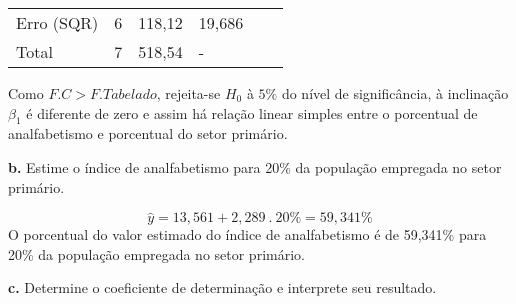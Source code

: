 \documentclass[
  openany]{book}
\begin{document}
\begin{longtable}[]{@{}llllll@{}}
\begin{minipage}[t]{0.14\columnwidth}
Erro (SQR)\strut
\end{minipage} & \begin{minipage}[t]{0.14\columnwidth}\raggedright
6\strut
\end{minipage} & \begin{minipage}[t]{0.14\columnwidth}\raggedright
118,12\strut
\end{minipage} & \begin{minipage}[t]{0.14\columnwidth}\raggedright
19,686\strut
\end{minipage} & \begin{minipage}[t]{0.14\columnwidth}\raggedright
\strut
\end{minipage} & \begin{minipage}[t]{0.14\columnwidth}\raggedright
\strut
\end{minipage}\tabularnewline
\begin{minipage}[t]{0.14\columnwidth}\raggedright
Total\strut
\end{minipage} & \begin{minipage}[t]{0.14\columnwidth}\raggedright
7\strut
\end{minipage} & \begin{minipage}[t]{0.14\columnwidth}\raggedright
518,54\strut
\end{minipage} & \begin{minipage}[t]{0.14\columnwidth}\raggedright
-\strut
\end{minipage} & \begin{minipage}[t]{0.14\columnwidth}\raggedright
\strut
\end{minipage} & \begin{minipage}[t]{0.14\columnwidth}\raggedright
\strut
\end{minipage}\tabularnewline
\bottomrule
\end{longtable}

Como \(F.C > F. Tabelado\), rejeita-se \(H_0\) à \(5\%\) do nível de significância, à inclinação \(\beta_1\) é diferente de zero e assim há relação linear simples entre o porcentual de analfabetismo e porcentual do setor primário.

\textbf{b.} Estime o índice de analfabetismo para 20\% da população empregada no setor primário.

\[\hat{y}=13,561+2,289 \ . \ 20\%=59,341\%\]
O porcentual do valor estimado do índice de analfabetismo é de 59,341\% para 20\% da população empregada no setor primário.

\textbf{c.} Determine o coeficiente de determinação e interprete seu resultado.
\end{document}
